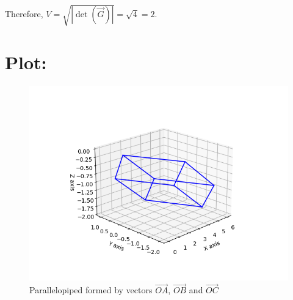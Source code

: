 \documentclass[a4paper, 12pt]{article}
\begin{document}
Therefore, $V = \sqrt{|\det(\vec{G})|} = \sqrt{4} = 2$.

\section{Plot: }
\begin{figure}[h!]
    \centering
    \includegraphics[width=\columnwidth]{figs/plot.png}
    \caption{Parallelopiped formed by vectors $\vec{OA}$, $\vec{OB}$ and $\vec{OC}$}
    \label{fig:2.10.29}
\end{figure}
\end{document}
